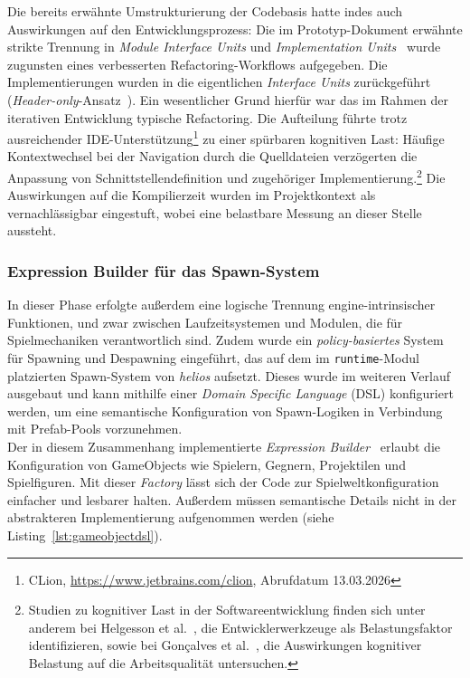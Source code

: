 Die bereits erwähnte Umstrukturierung der Codebasis hatte indes auch Auswirkungen auf den Entwicklungsprozess:
Die im Prototyp-Dokument erwähnte strikte Trennung in \textit{Module Interface Units} und \textit{Implementation Units}~\cite[S. 211-213]{Str24} wurde zugunsten eines verbesserten Refactoring-Workflows aufgegeben.
Die Implementierungen wurden in die eigentlichen \textit{Interface Units} zurückgeführt (\textit{Header-only}-Ansatz~\cite[S. 279]{Wil05}).
Ein wesentlicher Grund hierfür war das im Rahmen der iterativen Entwicklung typische Refactoring.
Die Aufteilung führte trotz ausreichender IDE-Unterstützung\footnote{
    CLion, \url{https://www.jetbrains.com/clion}, Abrufdatum 13.03.2026
} zu einer spürbaren kognitiven Last:
Häufige Kontextwechsel bei der Navigation durch die Quelldateien verzögerten die Anpassung von Schnittstellendefinition und zugehöriger Implementierung.\footnote{
    Studien zu kognitiver Last in der Softwareentwicklung finden sich unter anderem bei Helgesson et al.~\cite{HERB19}, die Entwicklerwerkzeuge als Belastungsfaktor identifizieren, sowie bei Gonçalves et al.~\cite{GSFF19}, die Auswirkungen kognitiver Belastung auf die Arbeitsqualität untersuchen.
}
Die Auswirkungen auf die Kompilierzeit wurden im Projektkontext als vernachlässigbar eingestuft, wobei eine belastbare Messung an dieser Stelle aussteht.


\subsubsection{Expression Builder für das Spawn-System}
In dieser Phase erfolgte außerdem eine logische Trennung engine-intrinsischer Funktionen, und zwar zwischen Laufzeitsystemen und Modulen, die für Spielmechaniken verantwortlich sind.
Zudem wurde ein \textit{policy-basiertes} System für Spawning und Despawning eingeführt, das auf dem im \texttt{runtime}-Modul platzierten Spawn-System von \textit{helios} aufsetzt.
Dieses wurde im weiteren Verlauf ausgebaut und kann mithilfe einer \textit{Domain Specific Language} (DSL) konfiguriert werden, um eine semantische Konfiguration von Spawn-Logiken in Verbindung mit Prefab-Pools vorzunehmen.\\

Der in diesem Zusammenhang implementierte \textit{Expression Builder}~\cite[S. 343-350]{FP11} erlaubt die Konfiguration von GameObjects wie Spielern, Gegnern, Projektilen und Spielfiguren.
Mit dieser \textit{Factory} lässt sich der Code zur Spielweltkonfiguration einfacher und lesbarer halten.
Außerdem müssen semantische Details nicht in der abstrakteren Implementierung aufgenommen werden (siehe Listing~\ref{lst:gameobjectdsl}).\\

